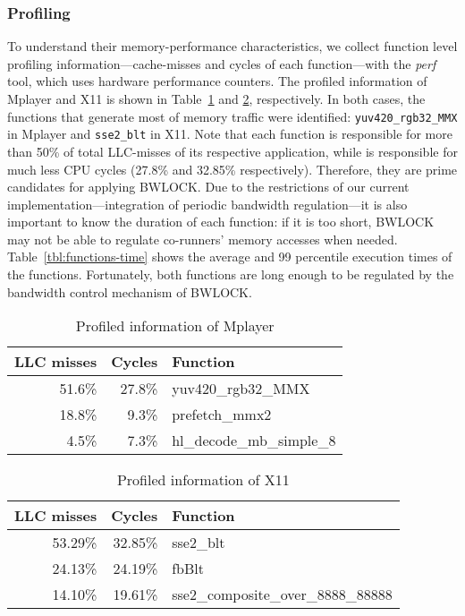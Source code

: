 \documentclass[times, 10pt,onecolumn]{article}
\newcommand{\bottomrule}{\hline}
\newcommand{\toprule}{\hline}
\newcommand{\midrule}{\hline}
\begin{document}
\subsubsection{Profiling}
To understand their memory-performance characteristics, we
collect function level profiling information---cache-misses and cycles
of each function---with the \emph{perf} tool, which uses hardware
performance counters. The profiled information of Mplayer and X11 is
shown in Table~\ref{tbl:mplayer-profile} and \ref{tbl:x11-profile},
respectively. In both cases, the functions that generate most of
memory traffic were identified: \texttt{yuv420\_rgb32\_MMX} in Mplayer
and \texttt{sse2\_blt} in X11. Note that each function is responsible
for more than 50\% of total LLC-misses of its respective application,
while is responsible for much less CPU cycles (27.8\% and 32.85\%
respectively). Therefore, they are prime candidates for applying
BWLOCK. Due to the restrictions of our current
implementation---integration of periodic bandwidth regulation---it
is also important to know the duration of each function: if it is too
short, BWLOCK may not be able to regulate co-runners' memory
accesses when needed. Table~\ref{tbl:functions-time} shows the
average and 99 percentile execution times of the
functions. Fortunately, both functions are long enough to be regulated
by the bandwidth control mechanism of BWLOCK.

\begin{table}[htbp]
\centering
\begin{tabular}{rrl}
\toprule
LLC misses & Cycles & Function \\
\midrule
51.6\% & 27.8\% & yuv420\_rgb32\_MMX \\
18.8\% & 9.3\% & prefetch\_mmx2 \\
4.5\% & 7.3\% & hl\_decode\_mb\_simple\_8 \\
\bottomrule
\end{tabular}\caption{Profiled information of Mplayer}
\label{tbl:mplayer-profile}\end{table}

\begin{table}[htbp]
\centering
\begin{tabular}{rrl}
\toprule
LLC misses & Cycles & Function \\
\midrule
53.29\% & 32.85\% & sse2\_blt\\
24.13\% & 24.19\% & fbBlt\\
14.10\% & 19.61\% & sse2\_composite\_over\_8888\_88888 \\
\bottomrule
\end{tabular}\caption{Profiled information of X11}
\label{tbl:x11-profile}\end{table}
\end{document}
